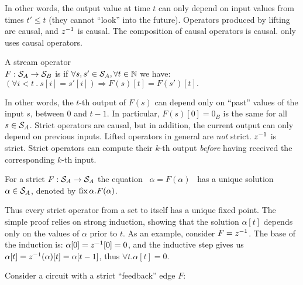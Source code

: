 \noindent
In other words, the output value at time $t$ can only depend on input
values from times $t' \leq t$ (they cannot ``look'' into the future).
Operators produced by lifting are causal, and $z^{-1}$ is causal.  The
composition of causal operators is causal.  \dbsp only uses causal
operators.

\begin{definition}[strictness]
A stream operator \\ $F:\mathcal{S}_{A}\to\mathcal{S}_{B}$
is 
if  $\forall s,s'\in\mathcal{S}_{A}, \forall t \in \mathbb{N}$ we have:
$(\forall i<t~.~s[i]=s'[i]) \Rightarrow F(s)[t]=F(s')[t].$
\end{definition}

In other words, the $t$-th output of $F(s)$ can depend only on
``past'' values of the input $s$, between $0$ and $t-1$.  In
particular, $F(s)[0] = 0_B$ is the same for all $s \in \mathcal{S}_{A}$.
Strict operators are causal, but in addition, the current output can
only depend on previous inputs.  Lifted operators in general are
\emph{not} strict.  $z^{-1}$ is strict.  Strict operators can compute
their $k$-th output \emph{before} having received the corresponding
$k$-th input.

\begin{proposition}
\label{prop-unique-fix}
For a strict $F: \mathcal{S}_{A} \to \mathcal{S}_{A}$ the equation ~$\alpha=F(\alpha)$~ has a unique
solution $\alpha \in \mathcal{S}_{A}$, denoted by $\mbox{fix}\,\alpha.F(\alpha)$.
\end{proposition}

Thus every strict operator from a set to itself has a unique fixed
point.  The simple proof relies on strong induction, showing that the
solution $\alpha[t]$ depends only on the values of $\alpha$ prior to
$t$.  As an example, consider $F = z^{-1}$.  The base of the induction
is: $\alpha[0] = z^{-1}[0] = 0$, and the inductive step gives us
$\alpha[t] = z^{-1}(\alpha)[t] = \alpha[t-1]$, thus $\forall t
. \alpha[t] = 0$.

Consider a circuit with a strict ``feedback'' edge $F$:
\begin{center}
\end{center}

